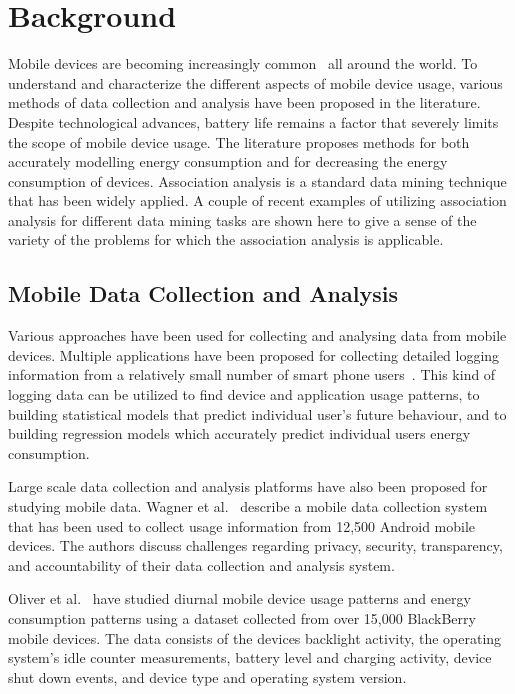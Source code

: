 \section{Background}

Mobile devices are becoming increasingly common~\cite{ITUstats} all around the world. To understand and characterize the different aspects of mobile device usage, various methods of data collection and analysis have been proposed in the literature. Despite technological advances, battery life remains a factor that severely limits the scope of mobile device usage. The literature proposes methods for both accurately modelling energy consumption and for decreasing the energy consumption of devices. Association analysis is a standard data mining technique that has been widely applied. A couple of recent examples of utilizing association analysis for different data mining tasks are shown here to give a sense of the variety of the problems for which the association analysis is applicable. 

\subsection{Mobile Data Collection and Analysis}

Various approaches have been used for collecting and analysing data from mobile devices. Multiple applications have been proposed for collecting detailed logging information from a relatively small number of smart phone users~\cite{Ferreira:2014:CES:2628363.2628367, Falaki:2010:DSU:1814433.1814453, 5375354}. This kind of logging data can be utilized to find device and application usage patterns, to building statistical models that predict individual user's future behaviour, and to building regression models which accurately predict individual users energy consumption. 

Large scale data collection and analysis platforms have also been proposed for studying mobile data. Wagner et al.~\cite{Wagner:2014:DAL:2627534.2627553} describe a mobile data collection system that has been used to collect usage information from 12,500 Android mobile devices. The authors discuss challenges regarding privacy, security, transparency, and accountability of their data collection and analysis system. 

Oliver et al.~\cite{Oliver:2010:CLS:1834616.1834623, Oliver_datadriven} have studied diurnal mobile device usage patterns and energy consumption patterns using a dataset collected from over 15,000 BlackBerry mobile devices. The data consists of the devices backlight activity, the operating system's idle counter measurements, battery level and charging activity, device shut down events, and device type and operating system version.      

